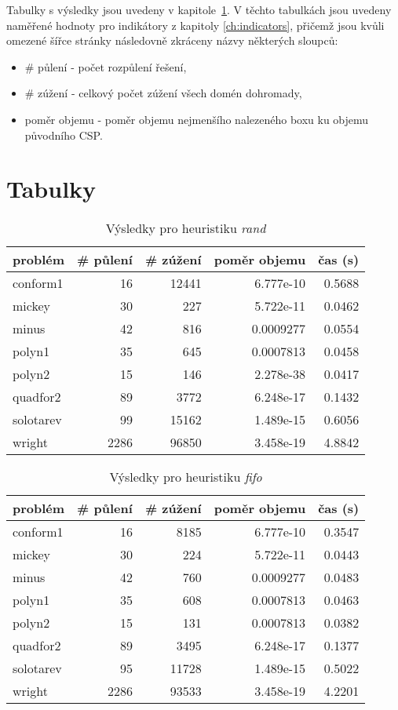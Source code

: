 {Tabulky s výsledky jsou uvedeny v kapitole~\ref{ch:resultTables}. V těchto tabulkách jsou uvedeny naměřené hodnoty pro indikátory z kapitoly \ref{ch:indicators}, přičemž jsou kvůli omezené šířce stránky následovně zkráceny názvy některých sloupců:


\begin{itemize}
    \item \# půlení - počet rozpůlení řešení,
    \item \# zúžení - celkový počet zúžení všech domén dohromady,
    \item poměr objemu - poměr objemu nejmenšího nalezeného boxu ku objemu původního CSP.
\end{itemize}


\section{Tabulky}
\label{ch:resultTables}


\begin{table}[H]
\centering
\begin{tabular}{lrrrr}
\hline
problém & \# půlení & \# zúžení & poměr objemu & čas (s) \\ \hline
conform1 & 16 & 12441 & 6.777e-10 & 0.5688 \\
mickey & 30 & 227 & 5.722e-11 & 0.0462 \\
minus & 42 & 816 & 0.0009277 & 0.0554 \\
polyn1 & 35 & 645 & 0.0007813 & 0.0458 \\
polyn2 & 15 & 146 & 2.278e-38 & 0.0417 \\
quadfor2 & 89 & 3772 & 6.248e-17 & 0.1432 \\
solotarev & 99 & 15162 & 1.489e-15 & 0.6056 \\
wright & 2286 & 96850 & 3.458e-19 & 4.8842 \\
\end{tabular}
\caption{Výsledky pro heuristiku \emph{rand}}
\label{rand}
\end{table}



\begin{table}[H]
\centering
\begin{tabular}{lrrrr}
\hline
problém & \# půlení & \# zúžení & poměr objemu & čas (s) \\ \hline
conform1 & 16 & 8185 & 6.777e-10 & 0.3547 \\
mickey & 30 & 224 & 5.722e-11 & 0.0443 \\
minus & 42 & 760 & 0.0009277 & 0.0483 \\
polyn1 & 35 & 608 & 0.0007813 & 0.0463 \\
polyn2 & 15 & 131 & 0.0007813 & 0.0382 \\
quadfor2 & 89 & 3495 & 6.248e-17 & 0.1377 \\
solotarev & 95 & 11728 & 1.489e-15 & 0.5022 \\
wright & 2286 & 93533 & 3.458e-19 & 4.2201 \\
\end{tabular}
\caption{Výsledky pro heuristiku \emph{fifo}}
\label{fifo}
\end{table}



}

